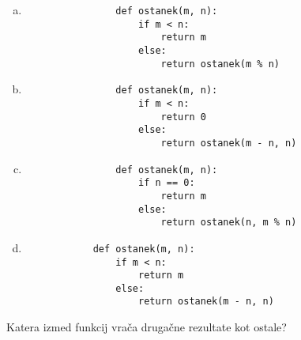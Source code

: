 \documentclass[arhiv, 10pt]{../izpit}
\begin{document}
        \begin{multicols}{2}
        \begin{enumerate}[(a)]
\item 
                \begin{verbatim}
                def ostanek(m, n):
                    if m < n:
                        return m
                    else:
                        return ostanek(m % n)
                \end{verbatim}
            
\item 
                \begin{verbatim}
                def ostanek(m, n):
                    if m < n:
                        return 0
                    else:
                        return ostanek(m - n, n)
                \end{verbatim}
            
\item 
                \begin{verbatim}
                def ostanek(m, n):
                    if n == 0:
                        return m
                    else:
                        return ostanek(n, m % n)
                \end{verbatim}
            
\item 
            \begin{verbatim}
            def ostanek(m, n):
                if m < n:
                    return m
                else:
                    return ostanek(m - n, n)
            \end{verbatim}
        
\end{enumerate}

        \end{multicols}
    
        \naloga*
        
        Katera izmed funkcij vrača drugačne rezultate kot ostale?
    
\end{document}
